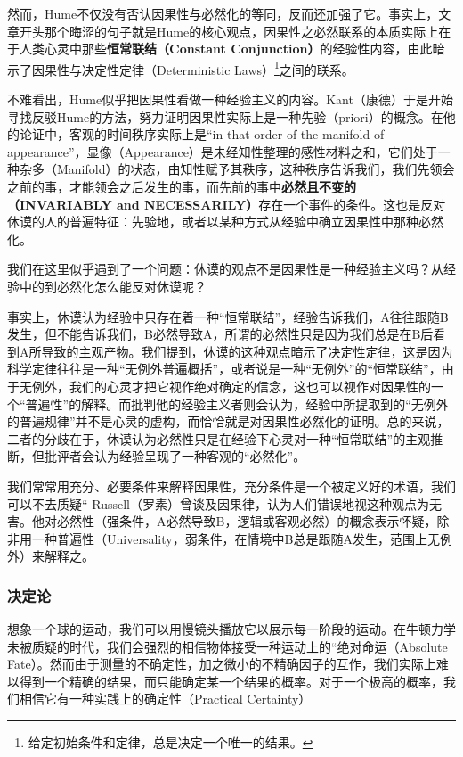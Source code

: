 \documentclass[12pt, a4paper, oneside]{ctexart}
\renewcommand{\b}{\textbf}
\newcommand{\f}{\footnote}
\newcommand{\q}[1]{\begin{questionbox}{}#1\end{questionbox}}
\newcommand{\ans}[1]{\begin{ansbox}{}#1\end{ansbox}}
\newcounter{question}[section]
\newcounter{ans}[section]
\begin{document}
然而，Hume不仅没有否认因果性与必然化的等同，反而还加强了它。事实上，文章开头那个晦涩的句子就是Hume的核心观点，因果性之必然联系的本质实际上在于人类心灵中那些\b{恒常联结（Constant Conjunction）}的经验性内容，由此暗示了因果性与决定性定律（Deterministic Laws）\f{给定初始条件和定律，总是决定一个唯一的结果。}之间的联系。

不难看出，Hume似乎把因果性看做一种经验主义的内容。Kant（康德）于是开始寻找反驳Hume的方法，努力证明因果性实际上是一种先验（priori）的概念。在他的论证中，客观的时间秩序实际上是“in that order of the manifold of appearance”，显像（Appearance）是未经知性整理的感性材料之和，它们处于一种杂多（Manifold）的状态，由知性赋予其秩序，这种秩序告诉我们，我们先领会之前的事，才能领会之后发生的事，而先前的事中\b{必然且不变的（INVARIABLY and NECESSARILY）}存在一个事件的条件。这也是反对休谟的人的普遍特征：先验地，或者以某种方式从经验中确立因果性中那种必然化。

\q{我们在这里似乎遇到了一个问题：休谟的观点不是因果性是一种经验主义吗？从经验中的到必然化怎么能反对休谟呢？}
\ans{事实上，休谟认为经验中只存在着一种“恒常联结”，经验告诉我们，A往往跟随B发生，但不能告诉我们，B必然导致A，所谓的必然性只是因为我们总是在B后看到A所导致的主观产物。我们提到，休谟的这种观点暗示了决定性定律，这是因为科学定律往往是一种“无例外普遍概括”，或者说是一种“无例外”的“恒常联结”，由于无例外，我们的心灵才把它视作绝对确定的信念，这也可以视作对因果性的一个“普遍性”的解释。而批判他的经验主义者则会认为，经验中所提取到的“无例外的普遍规律”并不是心灵的虚构，而恰恰就是对因果性必然化的证明。总的来说，二者的分歧在于，休谟认为必然性只是在经验下心灵对一种“恒常联结”的主观推断，但批评者会认为经验呈现了一种客观的“必然化”。}

我们常常用充分、必要条件来解释因果性，充分条件是一个被定义好的术语，我们可以不去质疑“
Russell（罗素）曾谈及因果律，认为人们错误地视这种观点为无害。他对必然性（强条件，A必然导致B，逻辑或客观必然）的概念表示怀疑，除非用一种普遍性（Universality，弱条件，在情境中B总是跟随A发生，范围上无例外）来解释之。

\subsubsection{决定论}

想象一个球的运动，我们可以用慢镜头播放它以展示每一阶段的运动。在牛顿力学未被质疑的时代，我们会强烈的相信物体接受一种运动上的“绝对命运（Absolute Fate）。然而由于测量的不确定性，加之微小的不精确因子的互作，我们实际上难以得到一个精确的结果，而只能确定某一个结果的概率。对于一个极高的概率，我们相信它有一种实践上的确定性（Practical Certainty）
\end{document}
